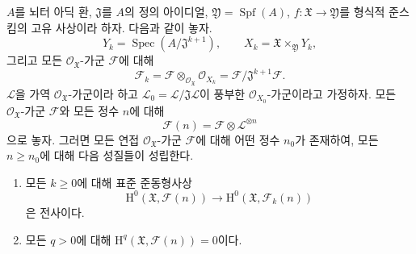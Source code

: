 \begin{proposition}[5.2.3]
\label{III.5.2.3-fr}
$A$를 뇌터 아딕 환, $\mathfrak J$를 $A$의 정의 아이디얼,
$\mathfrak Y=\operatorname{Spf}(A)$,
$f:\mathfrak X\to\mathfrak Y$를 형식적 준스킴의 고유 사상이라
하자. 다음과 같이 놓자.
\[
Y_k=\operatorname{Spec}(A/\mathfrak J^{k+1}),\qquad
X_k=\mathfrak X\times_{\mathfrak Y}Y_k,
\]
그리고 모든 $\mathcal O_{\mathfrak X}$-가군 $\mathcal F$에 대해
\[
\mathcal F_k
=\mathcal F\otimes_{\mathcal O_{\mathfrak X}}\mathcal O_{X_k}
=\mathcal F/\mathfrak J^{k+1}\mathcal F.
\]
$\mathcal L$을 가역 $\mathcal O_{\mathfrak X}$-가군이라 하고
$\mathcal L_0=\mathcal L/\mathfrak J\mathcal L$이 풍부한
$\mathcal O_{X_0}$-가군이라고 가정하자. 모든
$\mathcal O_{\mathfrak X}$-가군 $\mathcal F$와 모든 정수 $n$에
대해
\[
\mathcal F(n)=\mathcal F\otimes\mathcal L^{\otimes n}
\]
으로 놓자. 그러면 모든 연접 $\mathcal O_{\mathfrak X}$-가군
$\mathcal F$에 대해 어떤 정수 $n_0$가 존재하여, 모든
$n\geq n_0$에 대해 다음 성질들이 성립한다.
\begin{enumerate}
\item[(i)]
모든 $k\geq0$에 대해 표준 준동형사상
\[
\mathrm H^0(\mathfrak X,\mathcal F(n))
\longrightarrow
\mathrm H^0(\mathfrak X,\mathcal F_k(n))
\]
은 전사이다.
\item[(ii)]
모든 $q>0$에 대해
$\mathrm H^q(\mathfrak X,\mathcal F(n))=0$이다.
\end{enumerate}
\end{proposition}

